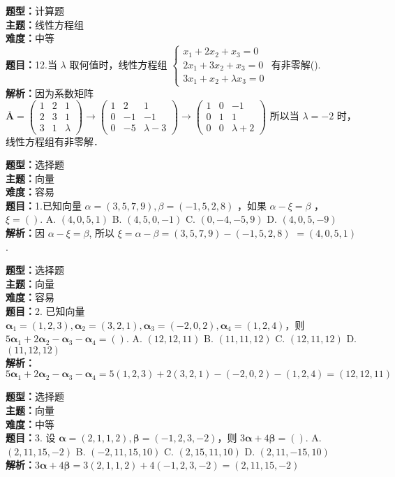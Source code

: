 \documentclass{ctexart}
\newenvironment{question}[5]{%
	\noindent\textbf{题型：}#1\\
	\textbf{主题：}#2\\
	\textbf{难度：}#3\\
	\textbf{题目：}#4\\
	\textbf{解析：}#5\\
	\vspace{1em}
}{}
\begin{document}
	
	\begin{question}
		{计算题}
		{线性方程组}
		{中等}
		{12.当 \(\lambda\) 取何值时，线性方程组 \(\left\{\begin{array}{r}x_1+2 x_2+x_3=0 \\ 2 x_1+3 x_2+x_3=0 \\ 3 x_1+x_2+\lambda x_3=0\end{array}\right.\) 有非零解(\qquad). }
		{因为系数矩阵 \(\overline{\mathbf{A}}=\left(\begin{array}{ccc}1 & 2 & 1 \\ 2 & 3 & 1 \\ 3 & 1 & \lambda\end{array}\right) \rightarrow\left(\begin{array}{ccc}1 & 2 & 1 \\ 0 & -1 & -1 \\ 0 & -5 & \lambda-3\end{array}\right) \rightarrow\left(\begin{array}{ccc}1 & 0 & -1 \\ 0 & 1 & 1 \\ 0 & 0 & \lambda+2\end{array}\right)\) 所以当 \(\lambda=-2\) 时，线性方程组有非零解．}
	\end{question}
	
	
		\begin{question}
		{选择题}
		{向量}
		{容易}
		{1.已知向量 \(\alpha=(3,5,7,9), \beta=(-1,5,2,8)\) ，如果 \(\alpha-\xi=\beta\) ， \(\xi=()\). 
			A. \((4,0,5,1)\)
			B. \((4,5,0,-1)\)
			C. \((0,-4,-5,9)\)
			D. \((4,0,5,-9)\)}
		{因 \(\alpha-\xi=\beta\), 所以 \(\xi=\alpha-\beta=(3,5,7,9)-(-1,5,2,8)\) \(=(4,0,5,1)\). }
	\end{question}
	
	
	\begin{question}
		{选择题}
		{向量}
		{容易}
		{2. 已知向量 \(\boldsymbol{\alpha}_1=(1,2,3), \boldsymbol{\alpha}_2=(3,2,1), \boldsymbol{\alpha}_3=(-2,0,2), \boldsymbol{\alpha}_4=(1,2,4)\)，则 \(5\boldsymbol{\alpha}_1+2\boldsymbol{\alpha}_2-\boldsymbol{\alpha}_3-\boldsymbol{\alpha}_4=()\). 
			A. \((12,12,11)\)
			B. \((11,11,12)\)
			C. \((12,11,12)\)
			D. \((11,12,12)\)}
		{\(5\boldsymbol{\alpha}_1+2\boldsymbol{\alpha}_2-\boldsymbol{\alpha}_3-\boldsymbol{\alpha}_4=5(1,2,3)+2(3,2,1)-(-2,0,2)-(1,2,4)=(12,12,11)\)}
	\end{question}
	
	\begin{question}
		{选择题}
		{向量}
		{中等}
		{3. 设 \(\boldsymbol{\alpha}=(2,1,1,2), \boldsymbol{\beta}=(-1,2,3,-2)\)，则 \(3\boldsymbol{\alpha}+4\boldsymbol{\beta}=()\). 
			A. \((2,11,15,-2)\)
			B. \((-2,11,15,10)\)
			C. \((2,15,11,10)\)
			D. \((2,11,-15,10)\)}
		{\(3\boldsymbol{\alpha}+4\boldsymbol{\beta}=3(2,1,1,2)+4(-1,2,3,-2)=(2,11,15,-2)\)}
	\end{question}
	
\end{document}
